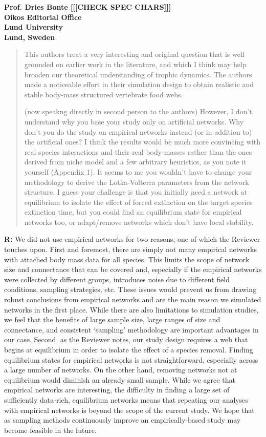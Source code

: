 \documentclass[12pt]{letter}
\begin{document}
\begin{letter}{\bf Prof. Dries Bonte [[[CHECK SPEC CHARS]]]\\
Oikos Editorial Office \\
Lund University \\
Lund, Sweden}
\begin{quotation}
  This authors treat a very interesting and original question that is well grounded on earlier work in the literature, and which I think may help broaden our theoretical understanding of trophic dynamics. The authors made a noticeable effort in their simulation design to obtain realistic and stable body-mass structured vertebrate food webs.


  (now speakng directly in second person to the authors) However, I don’t understand why you base your study only on artificial networks. Why don’t you do the study on empirical networks instead (or in addition to) the artificial ones? I think the results would be much more convincing with real species interactions and their real body-masses rather than the ones derived from niche model and a few arbitrary heuristics, as you note it yourself (Appendix 1). It seems to me you wouldn’t have to change your methodology to derive the Lotka-Volterra parameters from the network structure. I guess your challenge is that you initially need a network at equilibrium to isolate the effect of forced extinction on the target species extinction time, but you could find an equilibrium state for empirical networks too, or adapt/remove networks which don’t have local stability.
  \end{quotation}


  \textbf{R:} We did not use empirical networks for two reasons, one of which the Reviewer touches upon. First and foremost, there are simply not many empirical networks with attached body mass data for all species. This limits the scope of network size and connectance that can be covered and, especially if the empirical networks were collected by different groups, introduces noise due to different field conditions, sampling strategies, etc. These issues would prevent us from drawing robust conclusions from empirical networks and are the main reason we simulated networks in the first place. While there are also limitations to simulation studies, we feel that the benefits of large sample size, large ranges of size and connectance, and consistent `sampling' methodology are important advantages in our case.
  Second, as the Reviewer notes, our study design requires a web that begins at equilibrium in order to isolate the effect of a species removal. Finding equilibrium states for empirical networks is not straightforward, especially across a large number of networks. On the other hand, removing networks not at equilibrium would diminish an already small sample. While we agree that empirical networks are interesting, the difficulty in finding a large set of sufficiently data-rich, equilibrium networks means that repeating our analyses with empirical networks is beyond the scope of the current study.
  We hope that as sampling methods continuously improve an empirically-based study may become feasible in the future.



\end{letter}
\end{document}

